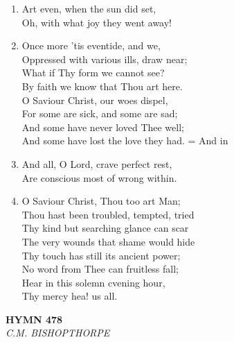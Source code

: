 \documentclass[11pt,a4paper]{article}
\begin{document}
\begin{enumerate}
    \item Art even, when the sun did set, \\
        Oh, with what joy they went away!

    \item Once more 'tis eventide, and we, \\
        Oppressed with various ills, draw near; \\
        What if Thy form we cannot see? \\
        By faith we know that Thou art here. \\
        O Saviour Christ, our woes dispel, \\
        For some are sick, and some are sad; \\
        And some have never loved Thee well; \\
        And some have lost the love they had. = And in

    \item And all, O Lord, crave perfect rest, \\
        Are conscious most of wrong within.

    \item O Saviour Christ, Thou too art Man; \\
        Thou hast been troubled, tempted, tried \\
        Thy kind but searching glance can scar \\
        The very wounds that shame would hide \\
        Thy touch has still its ancient power; \\
        No word from Thee can fruitless fall; \\
        Hear in this solemn cvening hour, \\
        Thy mercy hea! us all.

\end{enumerate}

\newpage
\begin{center}
    {\Large \textbf{HYMN 478}}
    \\
    \textit{C.M. BISHOPTHORPE}
\end{center}
\vspace{1em}
\end{document}

